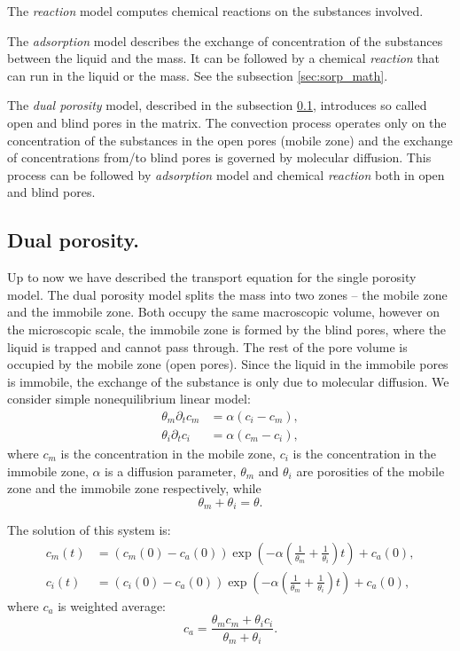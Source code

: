 The \emph{reaction} model computes chemical reactions on the substances involved.

The \emph{adsorption} model describes the exchange of concentration of the substances between the liquid and the mass. It can be
followed by a chemical \emph{reaction} that can run in the liquid or the mass.
See the subsection \ref{sec:sorp_math}.


The \emph{dual porosity} model, described in the subsection \ref{sec:dual_porosity}, introduces so called open and blind pores in the matrix. 
The convection process operates only on the concentration of the substances in the open pores (mobile zone) and the exchange of 
concentrations from/to blind pores is governed by molecular diffusion. This process can be followed by \emph{adsorption} model and 
chemical \emph{reaction} both in open and blind pores.


\subsection{Dual porosity.}
\label{sec:dual_porosity}

Up to now we have described the transport equation for the single porosity model. The dual porosity model splits the mass into two zones -- the mobile zone and the immobile zone. 
Both occupy the same macroscopic volume, however on the microscopic scale, the immobile zone is formed by the blind pores, where the liquid is trapped and cannot pass through.
The rest of the pore volume is occupied by the mobile zone (open pores). Since the liquid in the immobile pores is immobile, the exchange of the substance is only due to molecular diffusion.
We consider simple nonequilibrium linear model:
\begin{align}
    \theta_m \partial_t c_m &= \alpha ( c_i - c_m), \\
    \theta_i \partial_t c_i &= \alpha ( c_m - c_i), 
\end{align}
where $c_m$ is the concentration in the mobile zone, $c_i$ is the concentration in the immobile zone, $\alpha$ is a diffusion parameter, $\theta_m$ and $\theta_i$ are porosities of the mobile zone and the immobile zone respectively, while 
\[
  \theta_m +\theta_i =\theta.
\]

The solution of this system is:
\begin{align}
     c_m(t) &= (c_m(0) - c_a(0)) \exp\left(- \alpha\left(\frac{1}{\theta_m} + \frac{1}{\theta_i}\right) t \right) + c_a(0), \\
     c_i(t) &= (c_i(0) - c_a(0)) \exp\left(- \alpha\left(\frac{1}{\theta_m} + \frac{1}{\theta_i}\right) t \right) + c_a(0),
\end{align}
where $c_a$ is weighted average:
\[
  c_a = \frac{\theta_m c_m + \theta_i c_i}{\theta_m + \theta_i}.
\]


